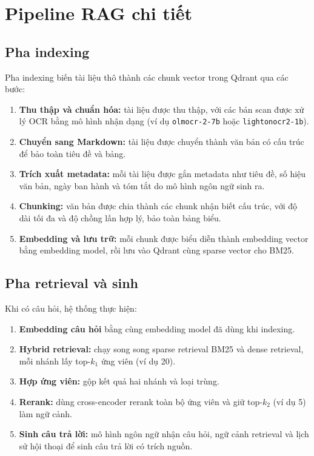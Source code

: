 \section{Pipeline RAG chi tiết}
\label{sec:pipeline-rag}

\subsection{Pha indexing}

Pha indexing biến tài liệu thô thành các chunk vector trong Qdrant qua các bước:

\begin{enumerate}
  \item \textbf{Thu thập và chuẩn hóa:} tài liệu được thu thập, với các bản scan được xử lý
  OCR bằng mô hình nhận dạng (ví dụ \texttt{olmocr-2-7b} hoặc \texttt{lightonocr2-1b}).
  \item \textbf{Chuyển sang Markdown:} tài liệu được chuyển thành văn bản có cấu trúc để bảo
  toàn tiêu đề và bảng.
  \item \textbf{Trích xuất metadata:} mỗi tài liệu được gắn metadata như tiêu đề, số hiệu
  văn bản, ngày ban hành và tóm tắt do mô hình ngôn ngữ sinh ra.
  \item \textbf{Chunking:} văn bản được chia thành các chunk nhận biết cấu trúc, với độ dài
  tối đa và độ chồng lấn hợp lý, bảo toàn bảng biểu.
  \item \textbf{Embedding và lưu trữ:} mỗi chunk được biểu diễn thành embedding vector bằng
  embedding model, rồi lưu vào Qdrant cùng sparse vector cho BM25.
\end{enumerate}

\subsection{Pha retrieval và sinh}

Khi có câu hỏi, hệ thống thực hiện:

\begin{enumerate}
  \item \textbf{Embedding câu hỏi} bằng cùng embedding model đã dùng khi indexing.
  \item \textbf{Hybrid retrieval:} chạy song song sparse retrieval BM25 và dense retrieval, mỗi nhánh
  lấy top-$k_1$ ứng viên (ví dụ 20).
  \item \textbf{Hợp ứng viên:} gộp kết quả hai nhánh và loại trùng.
  \item \textbf{Rerank:} dùng cross-encoder rerank toàn bộ ứng viên và giữ
  top-$k_2$ (ví dụ 5) làm ngữ cảnh.
  \item \textbf{Sinh câu trả lời:} mô hình ngôn ngữ nhận câu hỏi, ngữ cảnh retrieval và lịch
  sử hội thoại để sinh câu trả lời có trích nguồn.
\end{enumerate}

